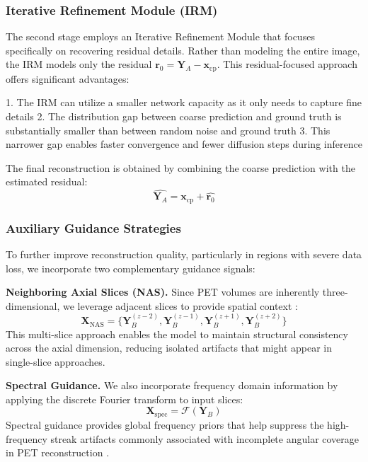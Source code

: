 \documentclass[
reprint,
superscriptaddress,
nofootinbib,
amsmath,amssymb,
aps,
prd,
]{revtex4-2}
\begin{document}
\subsubsection{Iterative Refinement Module (IRM)}
The second stage employs an Iterative Refinement Module that focuses specifically on recovering residual details. Rather than modeling the entire image, the IRM models only the residual \(\mathbf{r}_0 = \mathbf{Y}_A - \mathbf{x}_\text{cp}\). This residual-focused approach offers significant advantages:

1. The IRM can utilize a smaller network capacity as it only needs to capture fine details
2. The distribution gap between coarse prediction and ground truth is substantially smaller than between random noise and ground truth
3. This narrower gap enables faster convergence and fewer diffusion steps during inference

The final reconstruction is obtained by combining the coarse prediction with the estimated residual:
\begin{equation}
\widehat{\mathbf{Y}_A} = \mathbf{x}_\text{cp} + \widehat{\mathbf{r}_0}
\end{equation}
\subsubsection{Auxiliary Guidance Strategies}
To further improve reconstruction quality, particularly in regions with severe data loss, we incorporate two complementary guidance signals:

\textbf{Neighboring Axial Slices (NAS).} Since PET volumes are inherently three-dimensional, we leverage adjacent slices to provide spatial context \cite{xie2024}:
\begin{equation}
\mathbf{X}_{\text{NAS}} = \{\mathbf{Y}_B^{(z-2)}, \mathbf{Y}_B^{(z-1)}, \mathbf{Y}_B^{(z+1)}, \mathbf{Y}_B^{(z+2)}\}
\end{equation}
This multi-slice approach enables the model to maintain structural consistency across the axial dimension, reducing isolated artifacts that might appear in single-slice approaches.

\textbf{Spectral Guidance.} We also incorporate frequency domain information by applying the discrete Fourier transform to input slices:
\begin{equation}
\mathbf{X}_{\text{spec}} = \mathcal{F}(\mathbf{Y}_B)
\end{equation}
Spectral guidance provides global frequency priors that help suppress the high-frequency streak artifacts commonly associated with incomplete angular coverage in PET reconstruction \cite{luo2022}.
\end{document}
